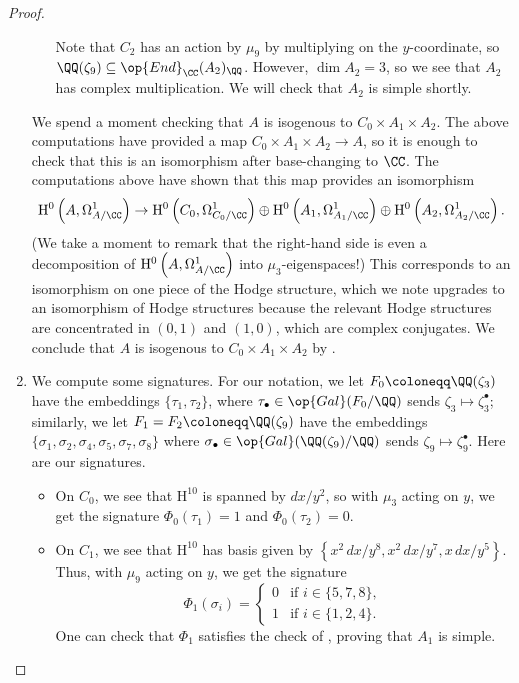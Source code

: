 \documentclass[../thesis.tex]{subfiles}
\begin{document}
\begin{proof}
\begin{enumerate}
\begin{itemize}
			Note that $C_2$ has an action by $\mu_9$ by multiplying on the $y$-coordinate, so $\QQ(\zeta_9)\subseteq\op{End}_\CC(A_2)_\QQ$. However, $\dim A_2=3$, so we see that $A_2$ has complex multiplication. We will check that $A_2$ is simple shortly.
		\end{itemize}
		We spend a moment checking that $A$ is isogenous to $C_0\times A_1\times A_2$. The above computations have provided a map $C_0\times A_1\times A_2\to A$, so it is enough to check that this is an isomorphism after base-changing to $\CC$. The computations above have shown that this map provides an isomorphism
		\[\mathrm H^0\left(A,\Omega^1_{A/\CC}\right)\to\mathrm H^0\left(C_0,\Omega^1_{C_0/\CC}\right)\oplus\mathrm H^0\left(A_1,\Omega^1_{A_1/\CC}\right)\oplus\mathrm H^0\left(A_2,\Omega^1_{A_2/\CC}\right).\]
		(We take a moment to remark that the right-hand side is even a decomposition of $\mathrm H^0\left(A,\Omega^1_{A/\CC}\right)$ into $\mu_3$-eigenspaces!) This corresponds to an isomorphism on one piece of the Hodge structure, which we note upgrades to an isomorphism of Hodge structures because the relevant Hodge structures are concentrated in $(0,1)$ and $(1,0)$, which are complex conjugates. We conclude that $A$ is isogenous to $C_0\times A_1\times A_2$ by .

		\item We compute some signatures. For our notation, we let $F_0\coloneqq\QQ(\zeta_3)$ have the embeddings $\{\tau_1,\tau_2\}$, where $\tau_\bullet\in\op{Gal}(F_0/\QQ)$ sends $\zeta_3\mapsto\zeta_3^\bullet$; similarly, we let $F_1=F_2\coloneqq\QQ(\zeta_9)$ have the embeddings $\{\sigma_1,\sigma_2,\sigma_4,\sigma_5,\sigma_7,\sigma_8\}$ where $\sigma_\bullet\in\op{Gal}(\QQ(\zeta_9)/\QQ)$ sends $\zeta_9\mapsto\zeta_9^\bullet$. Here are our signatures.
		\begin{itemize}
			\item On $C_0$, we see that $\mathrm H^{10}$ is spanned by $dx/y^2$, so with $\mu_3$ acting on $y$, we get the signature $\Phi_0(\tau_1)=1$ and $\Phi_0(\tau_2)=0$.

			\item On $C_1$, we see that $\mathrm H^{10}$ has basis given by $\left\{x^2\,dx/y^8,x^2\,dx/y^7,x\,dx/y^5\right\}$. Thus, with $\mu_9$ acting on $y$, we get the signature
			\[\Phi_1(\sigma_i)=\begin{cases}
				0 & \text{if }i\in\{5,7,8\}, \\
				1 & \text{if }i\in\{1,2,4\}.
			\end{cases}\]
			One can check that $\Phi_1$ satisfies the check of , proving that $A_1$ is simple.
			

\end{itemize}
\end{enumerate}
\end{proof}
\end{document}
